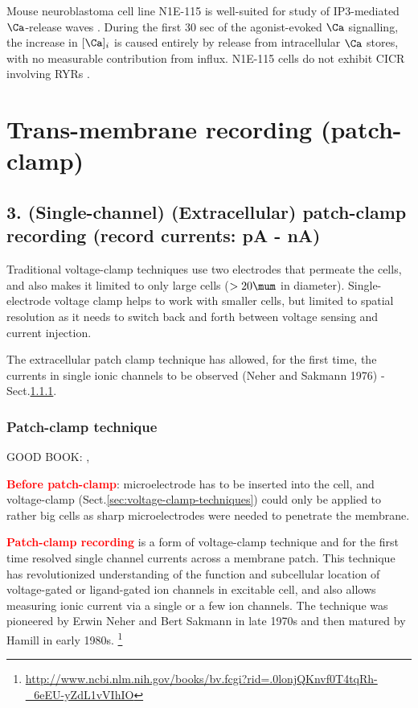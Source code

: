 Mouse neuroblastoma cell line N1E-115 is well-suited for study of IP3-mediated
$\Ca$-release waves \citep{surichamorn1990}. During the first 30 sec of the
agonist-evoked $\Ca$ signalling, the increase in $[\Ca]_i$ is caused entirely by
release from intracellular $\Ca$ stores, with no measurable contribution from
influx. N1E-115 cells do not exhibit CICR involving RYRs \citep{wang1995}.







\chapter{Trans-membrane recording (patch-clamp)}
\label{chap:voltage-clamp-patch}

\section{3. (Single-channel) (Extracellular) patch-clamp recording (record
currents:
pA - nA)}

Traditional voltage-clamp techniques use two electrodes that permeate the cells,
and also makes it limited to only large cells ($>20\mum$ in diameter).
Single-electrode voltage clamp helps to work with smaller cells, but limited to
spatial resolution as it needs to switch back and forth between voltage sensing
and current injection.

The extracellular patch clamp technique has allowed, for the first time, the
currents in single ionic channels to be observed (Neher and Sakmann 1976) -
Sect.\ref{sec:patch-clamp}.


\subsection{Patch-clamp technique}
\label{sec:patch-clamp}

GOOD BOOK: \citep{molleman2002}, \citep{rae1991}

\textcolor{red}{\bf Before patch-clamp}: microelectrode has to be inserted into
the cell, and voltage-clamp (Sect.\ref{sec:voltage-clamp-techniques}) could only
be applied to rather big cells as sharp microelectrodes were needed to penetrate
the membrane.

\textcolor{red}{\bf Patch-clamp recording} is a form of voltage-clamp technique
and for the first time resolved single channel currents across a membrane patch.
This technique has revolutionized understanding of the function and subcellular
location of voltage-gated or ligand-gated ion channels in excitable cell, and
also allows measuring ionic current via a single or a few ion channels.
The technique was pioneered by Erwin Neher and Bert Sakmann in late 1970s and
then matured by Hamill in early 1980s.
\footnote{\url{http://www.ncbi.nlm.nih.gov/books/bv.fcgi?rid=.0lonjQKnvf0T4tqRh-_6eEU-yZdL1vVIhIO}}



